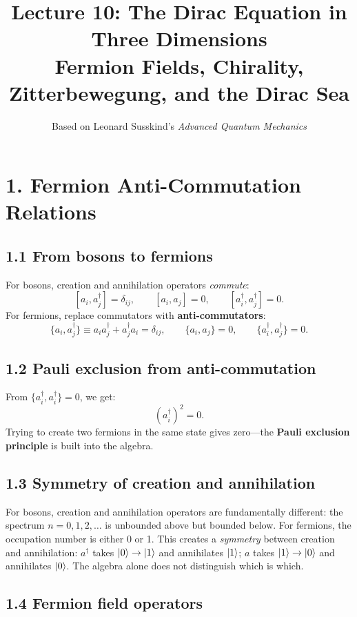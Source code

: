 \documentclass[12pt,a4paper]{article}
\title{\textbf{Lecture 10: The Dirac Equation in Three Dimensions} \\ \large Fermion Fields, Chirality, Zitterbewegung, and the Dirac Sea}
\author{Based on Leonard Susskind's \textit{Advanced Quantum Mechanics}}
\date{}
\begin{document}
\maketitle
\thispagestyle{fancy}

\section{1. Fermion Anti-Commutation Relations}

\subsection{1.1 From bosons to fermions}

For bosons, creation and annihilation operators \emph{commute}:
\[
    [a_i, a_j^\dagger] = \delta_{ij}, \qquad [a_i, a_j] = 0, \qquad [a_i^\dagger, a_j^\dagger] = 0.
\]
For fermions, replace commutators with \textbf{anti-commutators}:
\[
    \{a_i, a_j^\dagger\} \equiv a_i a_j^\dagger + a_j^\dagger a_i = \delta_{ij}, \qquad \{a_i, a_j\} = 0, \qquad \{a_i^\dagger, a_j^\dagger\} = 0.
\]

\subsection{1.2 Pauli exclusion from anti-commutation}

From $\{a_i^\dagger, a_i^\dagger\} = 0$, we get:
\[
    (a_i^\dagger)^2 = 0.
\]
Trying to create two fermions in the same state gives zero---the \textbf{Pauli exclusion principle} is built into the algebra.

\subsection{1.3 Symmetry of creation and annihilation}

For bosons, creation and annihilation operators are fundamentally different: the spectrum $n = 0, 1, 2, \ldots$ is unbounded above but bounded below.  For fermions, the occupation number is either 0 or 1.  This creates a \emph{symmetry} between creation and annihilation: $a^\dagger$ takes $\ket{0} \to \ket{1}$ and annihilates $\ket{1}$; $a$ takes $\ket{1} \to \ket{0}$ and annihilates $\ket{0}$.  The algebra alone does not distinguish which is which.

\subsection{1.4 Fermion field operators}
\end{document}

